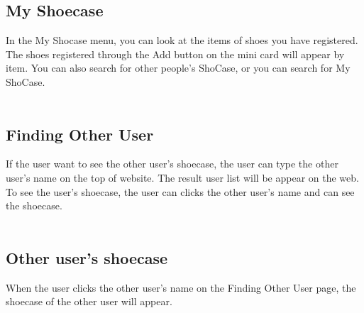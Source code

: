 \documentclass[conference]{IEEEtran}
\begin{document}
\begin{enumerate}
\subsection{My Shoecase}
In the My Shocase menu, you can look at the items of shoes you have registered. The shoes registered through the Add button on the mini card will appear by item. You can also search for other people's ShoCase, or you can search for My ShoCase.\\\\
\subsection{Finding Other User}
If the user want to see the other user's shoecase, the user can type the other user's name on the top of website. The result user list will be appear on the web. To see the user's shoecase, the user can clicks the other user's name and can see the shoecase.\\\\
\subsection{Other user's shoecase}
When the user clicks the other user's name on the Finding Other User page, the shoecase of the other user will appear.
\end{enumerate}
\end{document}
